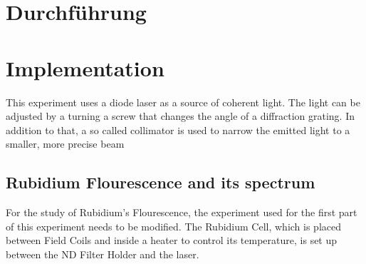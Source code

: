 \section{Durchführung}
\label{sec:Durchführung}

\section{Implementation}
\label{sec:implementation}
This experiment uses a diode laser as a source of coherent light. The light can be adjusted by a turning a screw that changes the angle of a diffraction grating. 
In addition to that, a so called collimator is used to narrow the emitted light to a smaller, more precise beam  


\subsection{Rubidium Flourescence and its spectrum}
\label{sec:Rubi}
For the study of Rubidium's Flourescence, the experiment used for the first part of this experiment needs to be modified.
The Rubidium Cell, which is placed between Field Coils and inside a heater to control its temperature, is set up between the ND Filter Holder and the laser.